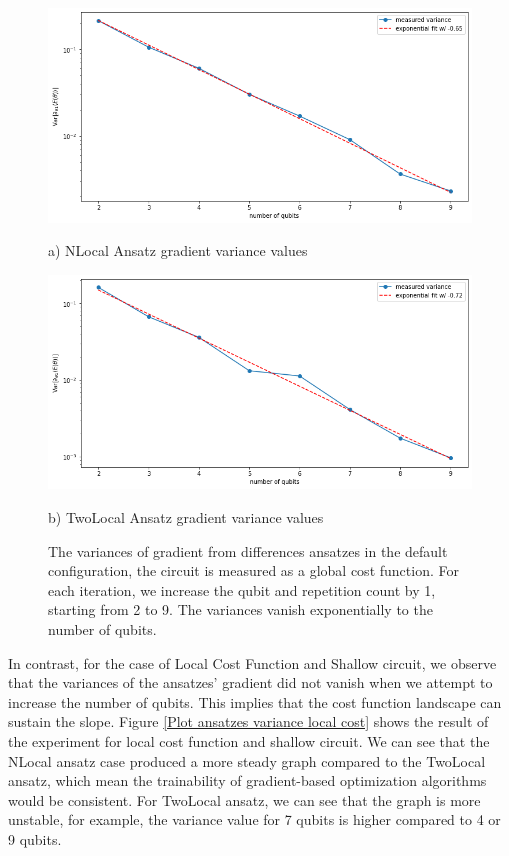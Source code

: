\begin{figure}
    \includegraphics[width=\textwidth]{Artefact/Appendices/NLocalDefault.png}
    \centerline{a) NLocal Ansatz gradient variance values}
    \includegraphics[width=\textwidth]{Artefact/Appendices/TwoLocalDefault.png}
    \centerline{b) TwoLocal Ansatz gradient variance values}
    \caption{
        The variances of gradient from differences ansatzes in the default configuration, the circuit is measured as a global cost function.
        For each iteration, we increase the qubit and repetition count by 1, starting from 2 to 9.
        The variances vanish exponentially to the number of qubits.
    }
    \label{Plot ansatzes variance default}
\end{figure}

In contrast, for the case of Local Cost Function and Shallow circuit, we observe that the variances of the ansatzes' gradient did not vanish when we attempt to increase the number of qubits.
This implies that the cost function landscape can sustain the slope.
Figure \ref{Plot ansatzes variance local cost} shows the result of the experiment for local cost function and shallow circuit.
We can see that the NLocal ansatz case produced a more steady graph compared to the TwoLocal ansatz, which mean the trainability of gradient-based optimization algorithms would be consistent.
For TwoLocal ansatz, we can see that the graph is more unstable, for example, the variance value for 7 qubits is higher compared to 4 or 9 qubits.


